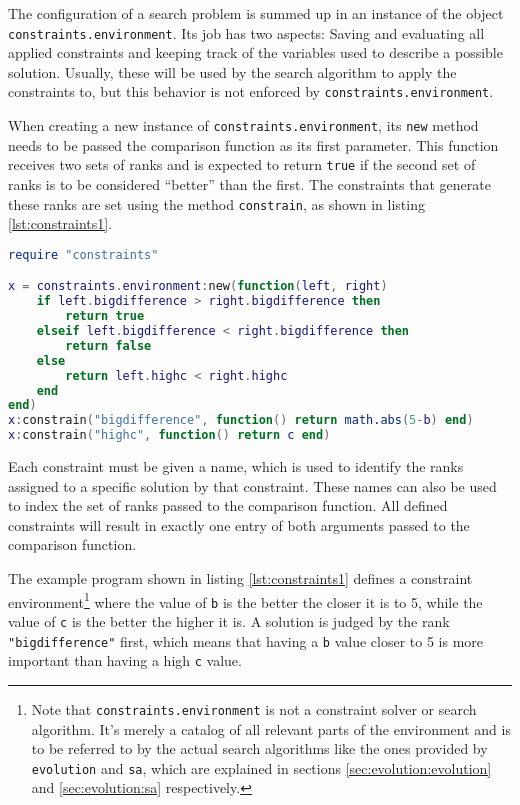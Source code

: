 The configuration of a search problem is summed up in an instance of the object \texttt{constraints.environment}. Its job has two aspects: Saving and evaluating all applied constraints and keeping track of the variables used to describe a possible solution. Usually, these will be used by the search algorithm to apply the constraints to, but this behavior is not enforced by \texttt{constraints.environment}.

When creating a new instance of \texttt{constraints.environment}, its \texttt{new} method needs to be passed the comparison function as its first parameter. This function receives two sets of ranks and is expected to return \texttt{true} if the second set of ranks is to be considered ``better'' than the first. The constraints that generate these ranks are set using the method \texttt{constrain}, as shown in listing \ref{lst:constraints1}.

\begin{lstlisting}[language=lua, caption={Example set up of \texttt{constraints.environment}}, label=lst:constraints1, name=lst:constraints]
require "constraints"

x = constraints.environment:new(function(left, right)
	if left.bigdifference > right.bigdifference then
		return true
	elseif left.bigdifference < right.bigdifference then
		return false
	else
		return left.highc < right.highc
	end
end)
x:constrain("bigdifference", function() return math.abs(5-b) end)
x:constrain("highc", function() return c end)
\end{lstlisting}

Each constraint must be given a name, which is used to identify the ranks assigned to a specific solution by that constraint. These names can also be used to index the set of ranks passed to the comparison function. All defined constraints will result in exactly one entry of both arguments passed to the comparison function. 

The example program shown in listing \ref{lst:constraints1} defines a constraint environment\footnote{Note that \texttt{constraints.environment} is not a constraint solver or search algorithm. It's merely a catalog of all relevant parts of the environment and is to be referred to by the actual search algorithms like the ones provided by \texttt{evolution} and \texttt{sa}, which are explained in sections \ref{sec:evolution:evolution} and \ref{sec:evolution:sa} respectively.} where the value of \texttt{b} is the better the closer it is to 5, while the value of \texttt{c} is the better the higher it is. A solution is judged by the rank \texttt{"bigdifference"} first, which means that having a \texttt{b} value closer to 5 is more important than having a high \texttt{c} value.

